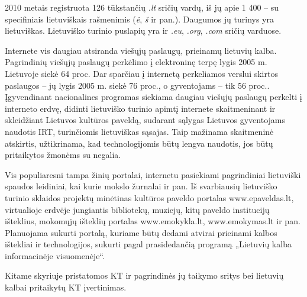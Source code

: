 \begin{multicols}{2}

2010 metais registruota 126 tūkstančių \textit{.lt} sričių vardų, iš jų apie 1 400 –  su specifiniais lietuviškais rašmenimis (\textit{ė}, \textit{š} ir pan.). Daugumos jų turinys yra lietuviškas. Lietuviško turinio puslapių yra ir \textit{.eu}, \textit{.org}, \textit{.com} sričių varduose.   


 Internete vis daugiau atsiranda viešųjų paslaugų, prieinamų lietuvių kalba. Pagrindinių viešųjų paslaugų perkėlimo į elektroninę terpę lygis 2005 m. Lietuvoje siekė 64 proc. Dar sparčiau į internetą perkeliamos verslui skirtos paslaugos – jų lygis 2005 m. siekė 76 proc., o gyventojams – tik 56 proc.\cite{esparama}.  Įgyvendinant nacionalines programas siekiama daugiau viešųjų paslaugų perkelti į interneto erdvę, didinti lietuviško turinio apimtį internete skaitmeninant ir skleidžiant Lietuvos kultūros paveldą, sudarant sąlygas Lietuvos gyventojams naudotis IRT, turinčiomis lietuviškas sąsajas. Taip mažinama skaitmeninė atskirtis, užtikrinama, kad technologijomis būtų lengva naudotis, jos būtų pritaikytos žmonėms su negalia.   

   Vis populiaresni tampa žinių portalai, internetu pasiekiami pagrindiniai lietuviški spaudos leidiniai, kai kurie mokslo žurnalai ir pan. Iš svarbiausių lietuviško turinio sklaidos projektų minėtinas kultūros paveldo portalas www.epaveldas.lt, virtualioje erdvėje jungiantis bibliotekų, muziejų, kitų paveldo institucijų išteklius, mokomųjų išteklių portalas www.emokykla.lt, www.emokymas.lt ir pan. Planuojama sukurti portalą, kuriame būtų dedami atvirai prieinami kalbos ištekliai ir technologijos, sukurti pagal prasidedančią programą „Lietuvių kalba informacinėje visuomenėje“.  

Kitame skyriuje pristatomos KT ir pagrindinės jų taikymo sritys bei lietuvių kalbai pritaikytų KT įvertinimas.

\end{multicols}

\clearpage


